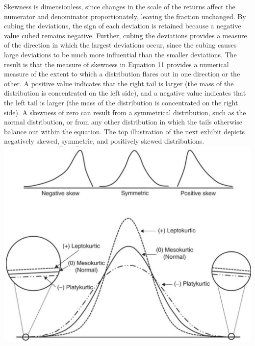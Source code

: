 \documentclass[11pt]{article}
\begin{document}
Skewness is dimensionless, since changes in the scale of the returns affect the numerator and denominator proportionately, leaving the fraction unchanged. By cubing the deviations, the sign of each deviation is retained because a negative value cubed remains negative. Further, cubing the deviations provides a measure of the direction in which the largest deviations occur, since the cubing causes large deviations to be much more influential than the smaller deviations. The result is that the measure of skewness in Equation 11 provides a numerical measure of the extent to which a distribution flares out in one direction or the other. A positive value indicates that the right tail is larger (the mass of the distribution is concentrated on the left side), and a negative value indicates that the left tail is larger (the mass of the distribution is concentrated on the right side). A skewness of zero can result from a symmetrical distribution, such as the normal distribution, or from any other distribution in which the tails otherwise balance out within the equation. The top illustration of the next exhibit depicts negatively skewed, symmetric, and positively skewed distributions.\\
\includegraphics[max width=\textwidth, center]{2024_04_10_817da4f390bf5301abf8g-4(3)}
\end{document}
